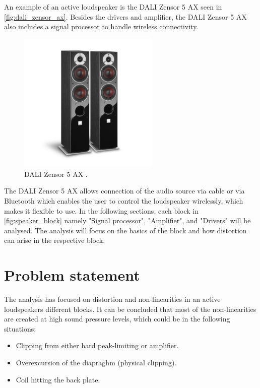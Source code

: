 An example of an active loudspeaker is the DALI Zensor 5 AX seen in \autoref{fig:dali_zensor_ax}. Besides the drivers and amplifier, the DALI Zensor 5 AX also includes a signal processor to handle wireless connectivity.
\begin{figure}[H]
\centering
\includegraphics[width=0.6\textwidth]{figures/dali_zensor_1_ax.jpg}
\caption{DALI Zensor 5 AX  \citep{sou:daliZensor5}.}
\label{fig:dali_zensor_ax}
\end{figure}
The DALI Zensor 5 AX allows connection of the audio source via cable or via Bluetooth which enables the user to control the loudspeaker wirelessly, which makes it flexible to use. In the following sections, each block in \autoref{fig:speaker_block} namely "Signal processor", "Amplifier", and "Drivers" will be analysed. The analysis will focus on the basics of the block and how distortion can arise in the respective block.







%

%

%

%

%

\section{Problem statement} \label{sec:problem_statement}
The analysis has focused on distortion and non-linearities in an active loudspeakers different blocks. It can be concluded that most of the non-linearities are created at high sound pressure levels, which could be in the following situations:
\begin{itemize}
\item Clipping from either hard peak-limiting or amplifier.
\item Overexcursion of the diapraghm (physical clipping). 
\item Coil hitting the back plate. 
\end{itemize}

